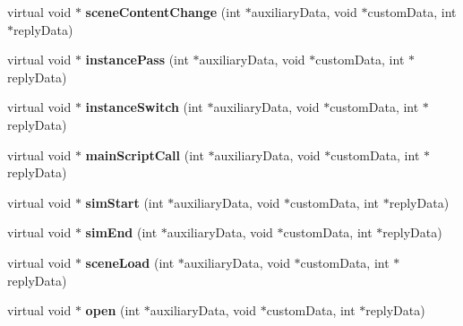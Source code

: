 \begin{DoxyCompactItemize}
\item 
virtual void $\ast$ {\bfseries scene\+Content\+Change} (int $\ast$auxiliary\+Data, void $\ast$custom\+Data, int $\ast$reply\+Data)\hypertarget{classVREPPlugin_a7df55bb967c9f217c77add60bb0d3868}{}\label{classVREPPlugin_a7df55bb967c9f217c77add60bb0d3868}

\item 
virtual void $\ast$ {\bfseries instance\+Pass} (int $\ast$auxiliary\+Data, void $\ast$custom\+Data, int $\ast$reply\+Data)\hypertarget{classVREPPlugin_affe1c1f37ffa8e04ea93e9eda9399402}{}\label{classVREPPlugin_affe1c1f37ffa8e04ea93e9eda9399402}

\item 
virtual void $\ast$ {\bfseries instance\+Switch} (int $\ast$auxiliary\+Data, void $\ast$custom\+Data, int $\ast$reply\+Data)\hypertarget{classVREPPlugin_ae288b5fdec3fee292f23e61a021f4f5e}{}\label{classVREPPlugin_ae288b5fdec3fee292f23e61a021f4f5e}

\item 
virtual void $\ast$ {\bfseries main\+Script\+Call} (int $\ast$auxiliary\+Data, void $\ast$custom\+Data, int $\ast$reply\+Data)\hypertarget{classVREPPlugin_a5aa8491d41b377e75917ab1273674f9f}{}\label{classVREPPlugin_a5aa8491d41b377e75917ab1273674f9f}

\item 
virtual void $\ast$ {\bfseries sim\+Start} (int $\ast$auxiliary\+Data, void $\ast$custom\+Data, int $\ast$reply\+Data)\hypertarget{classVREPPlugin_a58c9675c38c6ca1a75047864d3e4253c}{}\label{classVREPPlugin_a58c9675c38c6ca1a75047864d3e4253c}

\item 
virtual void $\ast$ {\bfseries sim\+End} (int $\ast$auxiliary\+Data, void $\ast$custom\+Data, int $\ast$reply\+Data)\hypertarget{classVREPPlugin_a13ea56c8546d762468b21ebc141b4ca3}{}\label{classVREPPlugin_a13ea56c8546d762468b21ebc141b4ca3}

\item 
virtual void $\ast$ {\bfseries scene\+Load} (int $\ast$auxiliary\+Data, void $\ast$custom\+Data, int $\ast$reply\+Data)\hypertarget{classVREPPlugin_a77e10632cbc7ae0581a151daea83ab1f}{}\label{classVREPPlugin_a77e10632cbc7ae0581a151daea83ab1f}

\item 
virtual void $\ast$ {\bfseries open} (int $\ast$auxiliary\+Data, void $\ast$custom\+Data, int $\ast$reply\+Data)\hypertarget{classVREPPlugin_a40ededcae0889e8f8ecdf99d0f455179}{}\label{classVREPPlugin_a40ededcae0889e8f8ecdf99d0f455179}


\end{DoxyCompactItemize}
